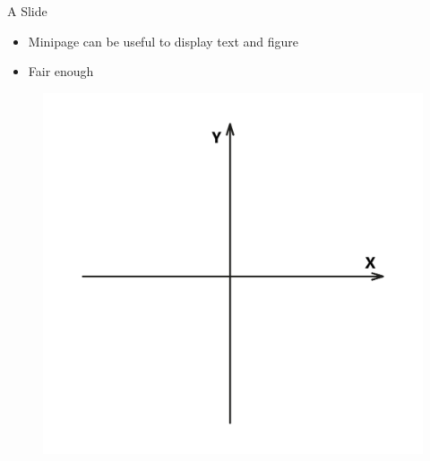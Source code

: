 \begin{frame}[label=section-slide]{A Slide}
    \begin{minipage}{0.49\linewidth}
        \begin{itemize}
            \item Minipage can be useful to display text and figure
            \vspace{1em}
            \item Fair enough \hyperlink{details}{}
        \end{itemize}
    \end{minipage}
    \begin{minipage}{0.49\linewidth}
          \begin{figure}
            \centering
            \includegraphics[width=\linewidth]{_graphic/graph-example.jpg}
          \end{figure}
    \end{minipage}
\end{frame}

